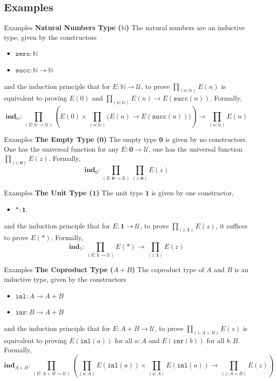 \documentclass[10pt, aspectratio=169]{beamer}
\newcommand{\U}{\mathcal{U}}
\newcommand{\Prod}[2]{\prod_{(#1)}{#2}}
\newcommand{\0}{\mathbf{0}}
\newcommand{\1}{\mathbf{1}}
\newcommand{\2}{\mathbf{2}}
\newcommand{\N}{\mathbb{N}}
\newcommand{\ind}{\mathbf{ind}}
\begin{document}
\subsection{Examples}

\begin{frame}{Examples}
  \textbf{Natural Numbers Type ($\N$)}
  The natural numbers are an inductive type, given by the constructors 
  \begin{itemize}
    \item $\mathtt{zero} : \N$ 
    \item $\mathtt{succ} : \N \to \N$
  \end{itemize}
  and the induction principle that for $E : \N \to \U$, to prove $\Prod{n : \N}{E(n)}$ is equivalent to proving
  $E(0)$ and $\Prod{n : \N} E(n) \to E(\mathtt{succ}(n))$.
  Formally, 
  \[
  \ind_\N : \Prod{E : \N \to \U}{\left( E(0) \times \Prod{n : \N} (E(n) \to E(\mathtt{succ}(n))) \right) \to \Prod{n:\N}{E(n)}}
  \]
\end{frame}

\begin{frame}{Examples}
  \textbf{The Empty Type ($\0$)}
  The empty type $\0$ is given by no constructors.
  One has the universal function for any $E : \0 \to \U$, one has the universal function $\Prod{z : \0}{E(z)}$.
  Formally, 
  \[
  \ind_0 : \Prod{E : \0 \to \U}{\Prod{z : \0}{E(z)}}
  \]
\end{frame} 
\begin{frame}{Examples}
 \textbf{The Unit Type ($\1$)}
  The unit type $\1$ is given by one constructor,
  \begin{itemize}
    \item $* : \1$.
  \end{itemize}
  and the induction principle that for $E : \1 \to \U$, to prove $\Prod{z : \1}{E(z)}$, it suffices to prove $E(*)$.
  Formally, 
  \[
  \ind_1 : \Prod{E : \1 \to \U}{E(*) \to \Prod{z : \1}{E(z)}}
  \]
\end{frame}

\begin{frame}{Examples}
  \textbf{The Coproduct Type ($A + B$)}
  The coproduct type of $A$ and $B$ is an inductive type, given by the constructors 
  \begin{itemize}
    \item $\mathtt{inl} : A \to A + B$ 
    \item $\mathtt{inr} : B \to A + B$
  \end{itemize}
  and the induction principle that for $E : A + B \to \U$, to prove $\Prod{z : A + B}{E(z)}$ is equivalent to proving 
  $E(\mathtt{inl} (a))$ for all $a : A$ and $E(\mathtt{inr} (b))$ for all $b : B$.
  Formally, 
  \[
  \ind_{A+B} : \Prod{E : A+B \to \U}{\left( \Prod{a : A}{E(\mathtt{inl}(a))} \times \Prod{a : A}{E(\mathtt{inl}(a))} \to \Prod{z : A + B}{E(z)} \right) }
  \]
\end{frame}
\end{document}
